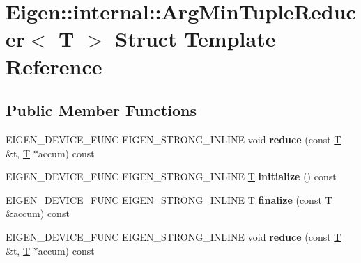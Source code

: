 \hypertarget{struct_eigen_1_1internal_1_1_arg_min_tuple_reducer}{}\section{Eigen\+:\+:internal\+:\+:Arg\+Min\+Tuple\+Reducer$<$ T $>$ Struct Template Reference}
\label{struct_eigen_1_1internal_1_1_arg_min_tuple_reducer}
\subsection*{Public Member Functions}
\begin{DoxyCompactItemize}
\item 
\mbox{\label{struct_eigen_1_1internal_1_1_arg_min_tuple_reducer_a8d45c619743b0bf25d8530529c2bd69b}} 
E\+I\+G\+E\+N\+\_\+\+D\+E\+V\+I\+C\+E\+\_\+\+F\+U\+NC E\+I\+G\+E\+N\+\_\+\+S\+T\+R\+O\+N\+G\+\_\+\+I\+N\+L\+I\+NE void {\bfseries reduce} (const \hyperlink{group___sparse_core___module}{T} \&t, \hyperlink{group___sparse_core___module}{T} $\ast$accum) const
\item 
\mbox{\label{struct_eigen_1_1internal_1_1_arg_min_tuple_reducer_a3861e16cd31e4f06c3d726dae9956fd9}} 
E\+I\+G\+E\+N\+\_\+\+D\+E\+V\+I\+C\+E\+\_\+\+F\+U\+NC E\+I\+G\+E\+N\+\_\+\+S\+T\+R\+O\+N\+G\+\_\+\+I\+N\+L\+I\+NE \hyperlink{group___sparse_core___module}{T} {\bfseries initialize} () const
\item 
\mbox{\label{struct_eigen_1_1internal_1_1_arg_min_tuple_reducer_aa825ab40b1079197432a31f70acce2dd}} 
E\+I\+G\+E\+N\+\_\+\+D\+E\+V\+I\+C\+E\+\_\+\+F\+U\+NC E\+I\+G\+E\+N\+\_\+\+S\+T\+R\+O\+N\+G\+\_\+\+I\+N\+L\+I\+NE \hyperlink{group___sparse_core___module}{T} {\bfseries finalize} (const \hyperlink{group___sparse_core___module}{T} \&accum) const
\item 
\mbox{\label{struct_eigen_1_1internal_1_1_arg_min_tuple_reducer_a8d45c619743b0bf25d8530529c2bd69b}} 
E\+I\+G\+E\+N\+\_\+\+D\+E\+V\+I\+C\+E\+\_\+\+F\+U\+NC E\+I\+G\+E\+N\+\_\+\+S\+T\+R\+O\+N\+G\+\_\+\+I\+N\+L\+I\+NE void {\bfseries reduce} (const \hyperlink{group___sparse_core___module}{T} \&t, \hyperlink{group___sparse_core___module}{T} $\ast$accum) const

\end{DoxyCompactItemize}
